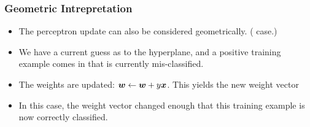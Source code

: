 \documentclass[trans]{beamer}
\begin{document}
\begin{frame}
  \frametitle{Geometric Intrepretation}
\begin{itemize}
\item
The perceptron update can also be considered geometrically.  ( case.) 
\item We have a current
guess as to the hyperplane, and  a positive training example comes in
that is currently mis-classified.  
\item The weights are updated: ${\boldsymbol{w}}
\leftarrow {\boldsymbol{w}} + y {\boldsymbol{x}}$.  This yields the new weight vector
\item In this case, the weight vector changed enough
that this training example is now correctly classified.
\end{itemize}
\end{frame}




\end{document}
